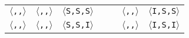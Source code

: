 \begin{tabular}{|c|c|c|c|c|c|c|}
\texttt{$\langle$\benchi{},\benchx{},\benchx{}$\rangle$}

& \texttt{$\langle$\benchs{},\benchx{},\benchx{}$\rangle$}
& \texttt{$\langle$S,S,S$\rangle$}

&
&

& \texttt{$\langle$\benchi{},\benchx{},\benchx{}$\rangle$}
& \texttt{$\langle$I,S,S$\rangle$}
\\
\cline{1-3}
\cline{6-7}

\texttt{$\langle$\benchx{},\benchx{},\benchi{}$\rangle$}

& \texttt{$\langle$\benchx{},\benchx{},\benchi{}$\rangle$}
& \texttt{$\langle$S,S,I$\rangle$}

&
&

& \texttt{$\langle$\benchi{},\benchx{},\benchi{}$\rangle$}
& \texttt{$\langle$I,S,I$\rangle$}
\\
\hline
\end{tabular}
